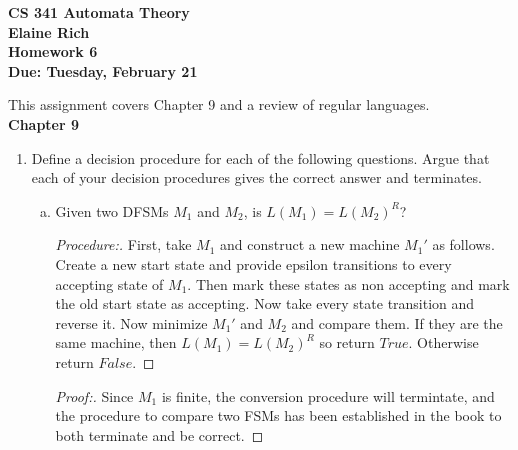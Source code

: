 \documentclass[10pt]{article}
\begin{document}
\begin{center}
\textbf{
CS 341 Automata Theory \\
Elaine Rich \\
Homework 6 \\
Due: Tuesday, February 21}\\
\end{center}
\noindent
This assignment covers Chapter 9 and a review of regular languages. \\

\noindent
\textbf{Chapter 9}
\begin{enumerate}[1)]

\item
Define a decision procedure for each of the following questions.  Argue that each of your decision procedures 
gives the correct answer and terminates.
\begin{enumerate}[a)]
\item
Given two DFSMs $M_1$ and $M_2$, is $L(M_1) = L(M_2)^R$?
\begin{proof}[Procedure:]
First, take $M_1$ and construct a new machine $M_1'$ as follows.  Create a new start state and provide epsilon transitions to every accepting state of $M_1$.  Then mark these states as non accepting and mark the old start state as accepting.  Now take every state transition and reverse it.  Now minimize $M_1'$ and $M_2$ and compare them.  If they are the same machine, then $L(M_1) = L(M_2)^R$ so return $True$.  Otherwise return $False$.
\end{proof}
\begin{proof}[Proof:]
Since $M_1$ is finite, the conversion procedure will termintate, and the procedure to compare two FSMs has been established in the book to both terminate and be correct.
\end{proof}


\end{enumerate}
\end{enumerate}
\end{document}
